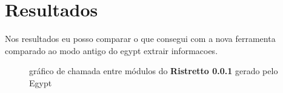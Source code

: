\section{Resultados}

Nos resultados eu posso comparar o que consegui com a nova ferramenta comparado ao modo antigo do egypt extrair informacoes.

\begin{figure}[h]
\center
{}
\qquad
{}
\caption{gráfico de chamada entre módulos do {\bf Ristretto 0.0.1} gerado pelo Egypt}
\end{figure}

